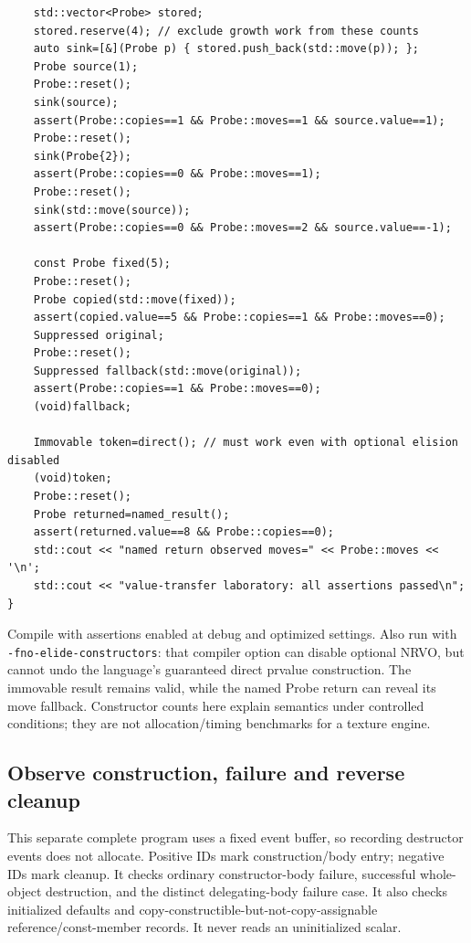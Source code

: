 \begin{verbatim}
    std::vector<Probe> stored;
    stored.reserve(4); // exclude growth work from these counts
    auto sink=[&](Probe p) { stored.push_back(std::move(p)); };
    Probe source(1);
    Probe::reset();
    sink(source);
    assert(Probe::copies==1 && Probe::moves==1 && source.value==1);
    Probe::reset();
    sink(Probe{2});
    assert(Probe::copies==0 && Probe::moves==1);
    Probe::reset();
    sink(std::move(source));
    assert(Probe::copies==0 && Probe::moves==2 && source.value==-1);

    const Probe fixed(5);
    Probe::reset();
    Probe copied(std::move(fixed));
    assert(copied.value==5 && Probe::copies==1 && Probe::moves==0);
    Suppressed original;
    Probe::reset();
    Suppressed fallback(std::move(original));
    assert(Probe::copies==1 && Probe::moves==0);
    (void)fallback;

    Immovable token=direct(); // must work even with optional elision disabled
    (void)token;
    Probe::reset();
    Probe returned=named_result();
    assert(returned.value==8 && Probe::copies==0);
    std::cout << "named return observed moves=" << Probe::moves << '\n';
    std::cout << "value-transfer laboratory: all assertions passed\n";
}
\end{verbatim}

Compile with assertions enabled at debug and optimized settings. Also run with \texttt{-fno-elide-constructors}: that compiler option can disable optional NRVO, but cannot undo the language's guaranteed direct prvalue construction. The immovable result remains valid, while the named Probe return can reveal its move fallback. Constructor counts here explain semantics under controlled conditions; they are not allocation/timing benchmarks for a texture engine.

\subsection{Observe construction, failure and reverse cleanup}\label{05-engine-i-ch004-observe-construction-failure-and-reverse-cleanup}

\hypertarget{05-engine-i-ch004-observe-construction-failure-and-reverse-cleanup}{}

This separate complete program uses a fixed event buffer, so recording destructor events does not allocate. Positive IDs mark construction/body entry; negative IDs mark cleanup. It checks ordinary constructor-body failure, successful whole-object destruction, and the distinct delegating-body failure case. It also checks initialized defaults and copy-constructible-but-not-copy-assignable reference/const-member records. It never reads an uninitialized scalar.

